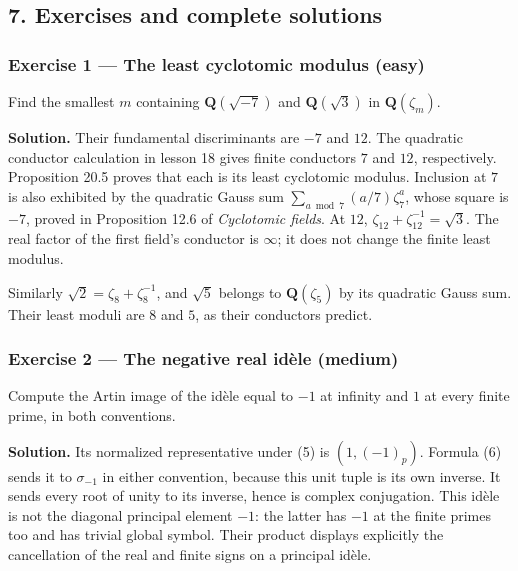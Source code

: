 \documentclass[11pt,a4paper]{article}
\begin{document}
\subsection{7. Exercises and complete
solutions}\label{exercises-and-complete-solutions}

\subsubsection{Exercise 1 --- The least cyclotomic modulus
(easy)}\label{exercise-1-the-least-cyclotomic-modulus-easy}

Find the smallest \(m\) containing \(\mathbf Q(\sqrt{-7})\) and
\(\mathbf Q(\sqrt3)\) in \(\mathbf Q(\zeta_m)\).

\textbf{Solution.} Their fundamental discriminants are \(-7\) and
\(12\). The quadratic conductor calculation in lesson 18 gives finite
conductors \(7\) and \(12\), respectively. Proposition 20.5 proves that
each is its least cyclotomic modulus. Inclusion at \(7\) is also
exhibited by the quadratic Gauss sum \(\sum_{a\bmod7}(a/7)\zeta_7^a\),
whose square is \(-7\), proved in Proposition 12.6 of \emph{Cyclotomic
fields}. At \(12\), \(\zeta_{12}+\zeta_{12}^{-1}=\sqrt3\). The real
factor of the first field's conductor is \(\infty\); it does not change
the finite least modulus.

Similarly \(\sqrt2=\zeta_8+\zeta_8^{-1}\), and \(\sqrt5\) belongs to
\(\mathbf Q(\zeta_5)\) by its quadratic Gauss sum. Their least moduli
are \(8\) and \(5\), as their conductors predict.

\subsubsection{Exercise 2 --- The negative real idèle
(medium)}\label{exercise-2-the-negative-real-iduxe8le-medium}

Compute the Artin image of the idèle equal to \(-1\) at infinity and
\(1\) at every finite prime, in both conventions.

\textbf{Solution.} Its normalized representative under (5) is
\((1,(-1)_p)\). Formula (6) sends it to \(\sigma_{-1}\) in either
convention, because this unit tuple is its own inverse. It sends every
root of unity to its inverse, hence is complex conjugation. This idèle
is not the diagonal principal element \(-1\): the latter has \(-1\) at
the finite primes too and has trivial global symbol. Their product
displays explicitly the cancellation of the real and finite signs on a
principal idèle.
\end{document}
